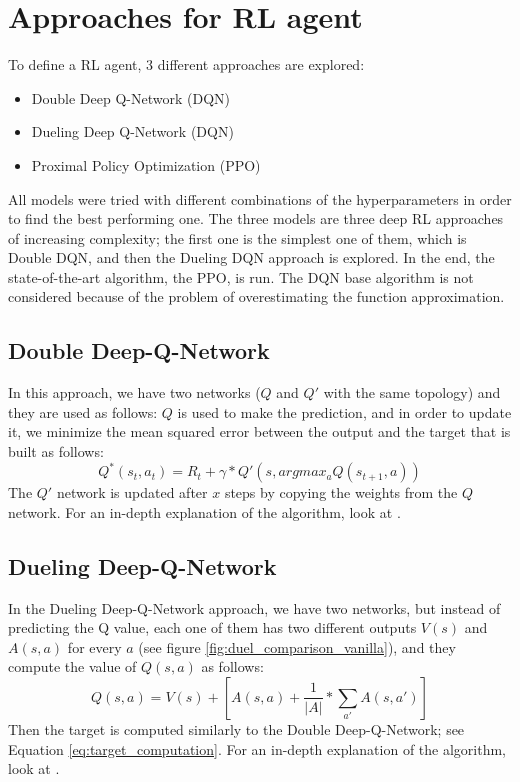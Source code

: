 \documentclass{article}
\begin{document}
\section{Approaches for RL agent} \label{section:Approaches}
To define a RL agent, 3 different approaches are explored:
\begin{itemize}
    \item Double Deep Q-Network (DQN) \cite{DoubleDeepQNetwork}
    \item Dueling Deep Q-Network (DQN) \cite{DuelDeepQNetwork}
    \item Proximal Policy Optimization (PPO) \cite{PPO}
\end{itemize}
All models were tried with different combinations of the hyperparameters in order to find the best performing one.
The three models are three deep RL approaches of increasing complexity; the first one is the simplest one of them, which is Double DQN, and then the Dueling DQN approach is explored. In the end, the state-of-the-art algorithm, the PPO, is run. The DQN base algorithm is not considered because of the problem of overestimating the function approximation.

\subsection{Double Deep-Q-Network} \label{subsection:Double}
In this approach, we have two networks ($Q$ and $Q'$ with the same topology) and they are used as follows: $Q$ is used to make the prediction, and in order to update it, we minimize the mean squared error between the output and the target that is built as follows:
\begin{equation}\label{eq:target_computation}
    Q^*(s_t,a_t) = R_t + \gamma * Q'(s, argmax_a Q(s_{t+1},a))
\end{equation}
The $Q'$ network is updated after $x$ steps by copying the weights from the $Q$ network.
For an in-depth explanation of the algorithm, look at \cite{DoubleDeepQNetwork}.

\subsection{Dueling Deep-Q-Network} \label{subsection:Duel}
In the Dueling Deep-Q-Network approach, we have two networks, but instead of predicting the Q value, each one of them has two different outputs $V(s)$ and $A(s,a)$ for every $a$ (see figure \ref{fig:duel_comparison_vanilla}), and they compute the value of $Q(s,a)$ as follows:
\begin{equation} \label{eq:q_v_a}
    Q(s,a) = V(s) + [A(s,a) + \frac{1}{|A|} *  \sum_{a'} A(s, a')]
\end{equation}
Then the target is computed similarly to the Double Deep-Q-Network; see Equation \ref{eq:target_computation}. For an in-depth explanation of the algorithm, look at \cite{DuelDeepQNetwork}.
\end{document}
